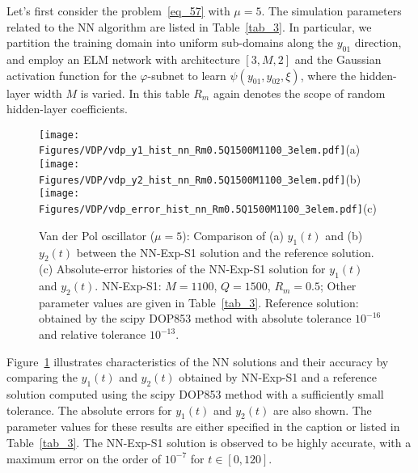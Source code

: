 Let's first consider the problem~\eqref{eq_57} with $\mu=5$.
The simulation parameters related to the NN algorithm
are listed in Table~\ref{tab_3}.
In particular, we partition the training domain into uniform sub-domains
along the $y_{01}$ direction, and employ an ELM network with
architecture $[3,M,2]$ and the Gaussian activation function
for the $\varphi$-subnet
to learn $\psi(y_{01},y_{02},\xi)$,
where the hidden-layer width $M$ is varied. In this table $R_m$ again
denotes the scope of random hidden-layer coefficients.



\begin{figure}
  \centerline{
    \texttt{[image: Figures/VDP/vdp\_y1\_hist\_nn\_Rm0.5Q1500M1100\_3elem.pdf]}(a)
    \texttt{[image: Figures/VDP/vdp\_y2\_hist\_nn\_Rm0.5Q1500M1100\_3elem.pdf]}(b)
    \texttt{[image: Figures/VDP/vdp\_error\_hist\_nn\_Rm0.5Q1500M1100\_3elem.pdf]}(c)
  }
  \caption{Van der Pol oscillator ($\mu=5$):
    Comparison of  (a) $y_1(t)$ and (b) $y_2(t)$ between the
    NN-Exp-S1 solution and the reference solution. (c) Absolute-error histories of
    the NN-Exp-S1 solution for $y_1(t)$ and $y_2(t)$.
    NN-Exp-S1: $M=1100$, $Q=1500$,
    $R_m=0.5$; Other parameter values are
    given in Table~\ref{tab_3}.
    Reference solution: obtained by the scipy DOP853 method with absolute tolerance $10^{-16}$ and
    relative tolerance $10^{-13}$.
  }
  \label{fg_16}
\end{figure}

Figure~\ref{fg_16} illustrates characteristics of the NN solutions
and their accuracy by comparing the  $y_1(t)$ and $y_2(t)$
obtained by NN-Exp-S1 and a reference solution computed using the scipy DOP853 method
with a sufficiently small tolerance. The absolute errors for $y_1(t)$ and
$y_2(t)$ are also shown. The parameter values for these results
are either specified in the caption or listed in Table~\ref{tab_3}.
The NN-Exp-S1 solution is observed to be highly accurate, with a maximum error
on the order of $10^{-7}$ for $t\in[0,120]$.



